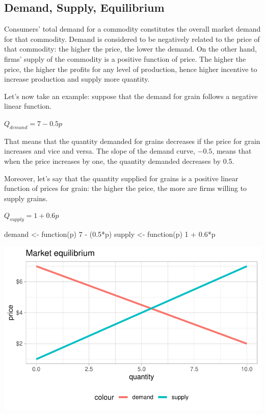 \documentclass[
  letterpaper,
  DIV=11,
  numbers=noendperiod]{scrreprt}
\newenvironment{Shaded}{\begin{snugshade}}{\end{snugshade}}
\newcommand{\ControlFlowTok}[1]{\textcolor[rgb]{0.00,0.23,0.31}{#1}}
\newcommand{\DecValTok}[1]{\textcolor[rgb]{0.68,0.00,0.00}{#1}}
\newcommand{\FloatTok}[1]{\textcolor[rgb]{0.68,0.00,0.00}{#1}}
\newcommand{\NormalTok}[1]{\textcolor[rgb]{0.00,0.23,0.31}{#1}}
\newcommand{\OtherTok}[1]{\textcolor[rgb]{0.00,0.23,0.31}{#1}}
\newcommand{\SpecialCharTok}[1]{\textcolor[rgb]{0.37,0.37,0.37}{#1}}
\begin{document}
\hypertarget{demand-supply-equilibrium}{%
\subsection{Demand, Supply,
Equilibrium}\label{demand-supply-equilibrium}}

Consumers' total demand for a commodity constitutes the overall market
demand for that commodity. Demand is considered to be negatively related
to the price of that commodity: the higher the price, the lower the
demand. On the other hand, firms' supply of the commodity is a positive
function of price. The higher the price, the higher the profits for any
level of production, hence higher incentive to increase production and
supply more quantity.

Let's now take an example: suppose that the demand for grain follows a
negative linear function.

\(Q_{demand} = 7-0.5p\)

That means that the quantity demanded for grains decreases if the price
for grain increases and vice and versa. The slope of the demand curve,
\(-0.5\), means that when the price increases by one, the quantity
demanded decreases by 0.5.

Moreover, let's say that the quantity supplied for grains is a positive
linear function of prices for grain: the higher the price, the more are
firms willing to supply grains.

\(Q_{supply} = 1+0.6p\)

\begin{Shaded}
\begin{Highlighting}[]
\NormalTok{demand }\OtherTok{\textless{}{-}} \ControlFlowTok{function}\NormalTok{(p) }\DecValTok{7} \SpecialCharTok{{-}}\NormalTok{ (}\FloatTok{0.5}\SpecialCharTok{*}\NormalTok{p)}
\NormalTok{supply }\OtherTok{\textless{}{-}} \ControlFlowTok{function}\NormalTok{(p) }\DecValTok{1} \SpecialCharTok{+} \FloatTok{0.6}\SpecialCharTok{*}\NormalTok{p}
\end{Highlighting}
\end{Shaded}

\includegraphics{intro_files/figure-pdf/unnamed-chunk-3-1.pdf}
\end{document}
